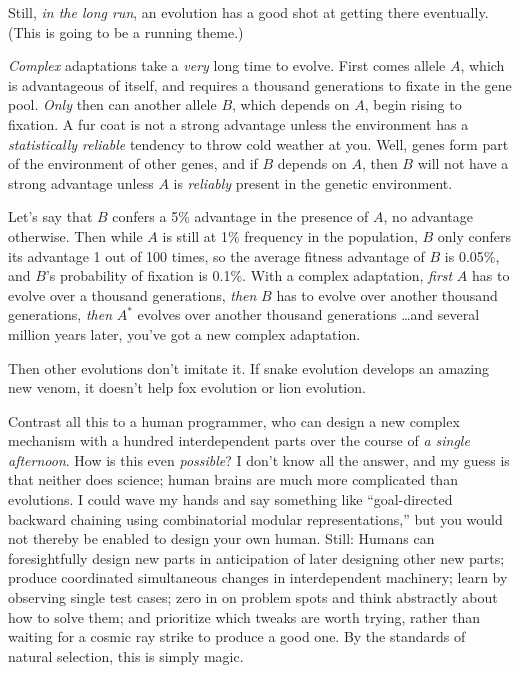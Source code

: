 {
 Still, \textit{in the long run}, an evolution has a good shot at
getting there eventually. (This is going to be a running theme.)}

{
 \textit{Complex} adaptations take a \textit{very} long time to
evolve. First comes allele $A$, which is advantageous of itself, and
requires a thousand generations to fixate in the gene pool.
\textit{Only} then can another allele $B$, which depends on $A$, begin
rising to fixation. A fur coat is not a strong advantage unless the
environment has a \textit{statistically reliable} tendency to throw
cold weather at you. Well, genes form part of the environment of other
genes, and if $B$ depends on $A$, then $B$ will not have a strong advantage
unless $A$ is \textit{reliably} present in the genetic environment.}

{
 Let's say that $B$ confers a 5\% advantage in the
presence of $A$, no advantage otherwise. Then while $A$ is still at 1\%
frequency in the population, $B$ only confers its advantage 1 out of 100
times, so the average fitness advantage of $B$ is 0.05\%, and
$B$'s probability of fixation is 0.1\%. With a complex
adaptation, \textit{first} $A$ has to evolve over a thousand generations,
\textit{then} $B$ has to evolve over another thousand generations,
\textit{then} $A^{*}$ evolves over another thousand
generations \ldots and several million years later,
you've got a new complex adaptation.}

{
 Then other evolutions don't imitate it. If snake
evolution develops an amazing new venom, it doesn't
help fox evolution or lion evolution.}

{
 Contrast all this to a human programmer, who can design a new
complex mechanism with a hundred interdependent parts over the course
of \textit{a single afternoon}. How is this even \textit{possible}? I
don't know all the answer, and my guess is that neither
does science; human brains are much more complicated than evolutions. I
could wave my hands and say something like
``goal-directed backward chaining using combinatorial
modular representations,'' but you would not thereby
be enabled to design your own human. Still: Humans can foresightfully
design new parts in anticipation of later designing other new parts;
produce coordinated simultaneous changes in interdependent machinery;
learn by observing single test cases; zero in on problem spots and
think abstractly about how to solve them; and prioritize which tweaks
are worth trying, rather than waiting for a cosmic ray strike to
produce a good one. By the standards of natural selection, this is
simply magic.}

